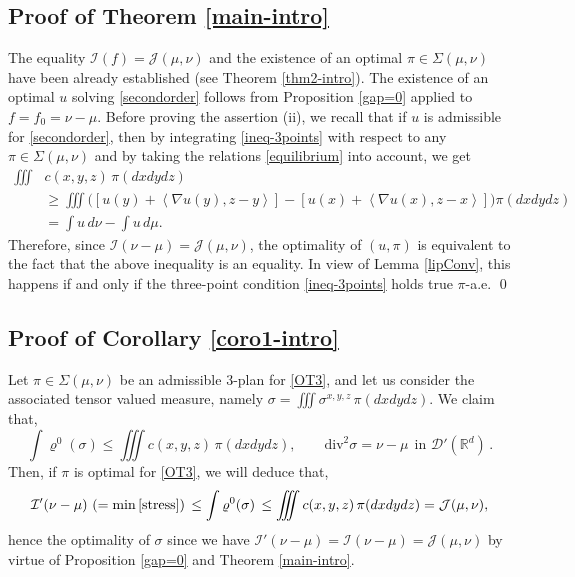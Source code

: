 \documentclass[11pt,letterpaper,reqno]{amsart}
\theoremstyle{definition}
\numberwithin{equation}{section}
\newcommand{\R}{\mathbb{R}}
\newcommand{\JJ}{\mathcal{J}}
\newcommand{\dive}{{\mathrm{div}}}
\newcommand{\pairing}[1]{{\left \langle #1 \right \rangle}}
\newcommand{\I}{\mathcal{I}}
\newcommand{\D}{\mathcal{D}}
\begin{document}
{\subsection{Proof of Theorem \ref{main-intro}}

The equality $\I(f) = \JJ(\mu,\nu)$ and the existence of an optimal  $\pi\in \Sigma(\mu,\nu)$ have been already established (see Theorem \ref{thm2-intro}). The existence of an optimal $u$ solving \eqref{secondorder}
follows from Proposition \ref{gap=0} applied to $f = f_0 = \nu-\mu$.
Before proving the assertion (ii), we  recall  that if $u$ is admissible for \eqref{secondorder}, then  by integrating \eqref{ineq-3points}  with respect to any $\pi\in \Sigma(\mu,\nu)$ and by taking the relations \eqref{equilibrium} into account, we get
\begin{align*}
	\iiint & c(x,y,z)\, \pi(dxdydz)  \\
	&\geq \iiint \Big(\left[u(y) + \pairing{\nabla u(y), z-y}\right] -\left[u(x) + \pairing{\nabla u(x), z-x} \right] \Big) \pi(dxdydz) \\
	&= \int u \,d\nu- \int u\, d\mu.
\end{align*}
Therefore, since $\I(\nu-\mu)= \mathcal{J}(\mu,\nu)$, the optimality of $(u,\pi)$ is equivalent to the fact that the above inequality is an equality.
In view of {Lemma \ref{lipConv}}, this happens  if and only if the three-point condition \eqref{ineq-3points} holds true $\pi$-a.e. 
\qed



\subsection{Proof of Corollary \ref{coro1-intro}}  Let $\pi \in \Sigma(\mu,\nu)$ be an admissible 3-plan for \eqref{OT3},
and let us consider the  associated tensor valued measure, namely $\sigma= \iiint \sigma^{x,y,z} \, \pi(dxdydz)$. 
We claim that,
\begin{equation}\label{si-admi}
\int \varrho^0(\sigma)  \le  \iiint c(x,y,z)\, \pi(dxdydz),\qquad  \dive^2 \sigma = \nu-\mu \ \ \text{in $\D'(\R^d)$}\, .
\end{equation}
Then, if $\pi$ is optimal for \eqref{OT3}, we  will deduce that,
$$ \I'(\nu-\mu)\  (=\min \eqref{stress}) \, \le \int \varrho^0(\sigma) \, \le \iiint c(x,y,z)\, \pi(dxdydz) = \JJ(\mu,\nu) ,$$
hence the optimality of $\sigma$ since we have {$\I'(\nu-\mu) =\I(\nu-\mu)=\JJ(\mu,\nu)$} by virtue of Proposition \ref{gap=0}
and Theorem \ref{main-intro}.

}
\end{document}
